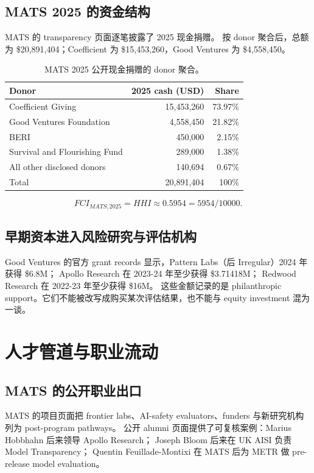 \documentclass[11pt,twoside]{article}
\begin{document}
\subsection{MATS 2025 的资金结构}
MATS 的 transparency 页面逐笔披露了 2025 现金捐赠。 按 donor 聚合后，总额为 \$20,891,404；Coefficient 为 \$15,453,260，Good Ventures 为 \$4,558,450。

\begin{table}[ht]
\centering\small
\begin{tabular}{lrr}
\toprule
Donor & 2025 cash (USD) & Share \\
\midrule
Coefficient Giving & 15,453,260 & 73.97\% \\
Good Ventures Foundation & 4,558,450 & 21.82\% \\
BERI & 450,000 & 2.15\% \\
Survival and Flourishing Fund & 289,000 & 1.38\% \\
All other disclosed donors & 140,694 & 0.67\% \\
\midrule
Total & 20,891,404 & 100\% \\
\bottomrule
\end{tabular}
\caption{MATS 2025 公开现金捐赠的 donor 聚合。}
\end{table}

\[
FCI_{MATS,2025}=HHI\approx0.5954=5954/10000.
\]

\subsection{早期资本进入风险研究与评估机构}
Good Ventures 的官方 grant records 显示，Pattern Labs（后 Irregular）2024 年获得 \$6.8M； Apollo Research 在 2023-24 年至少获得 \$3.71418M； Redwood Research 在 2022-23 年至少获得 \$16M。 这些金额记录的是 philanthropic support。它们不能被改写成购买某次评估结果，也不能与 equity investment 混为一谈。

\section{人才管道与职业流动}
\subsection{MATS 的公开职业出口}
MATS 的项目页面把 frontier labs、AI-safety evaluators、funders 与新研究机构列为 post-program pathways。 公开 alumni 页面提供了可复核案例：Marius Hobbhahn 后来领导 Apollo Research； Joseph Bloom 后来在 UK AISI 负责 Model Transparency； Quentin Feuillade-Montixi 在 MATS 后为 METR 做 pre-release model evaluation。
\end{document}
